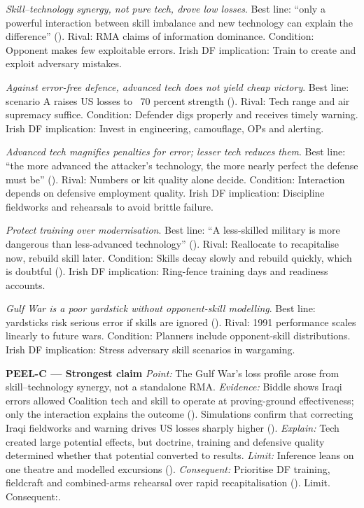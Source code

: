 \emph{Skill–technology synergy, not pure tech, drove low losses}. Best line: “only a powerful interaction between skill imbalance and new technology can explain the difference” (). Rival: RMA claims of information dominance. Condition: Opponent makes few exploitable errors. Irish DF implication: Train to create and exploit adversary mistakes.

\emph{Against error-free defence, advanced tech does not yield cheap victory}. Best line: scenario A raises US losses to ~70 percent strength (). Rival: Tech range and air supremacy suffice. Condition: Defender digs properly and receives timely warning. Irish DF implication: Invest in engineering, camouflage, OPs and alerting.

\emph{Advanced tech magnifies penalties for error; lesser tech reduces them}. Best line: “the more advanced the attacker's technology, the more nearly perfect the defense must be” (). Rival: Numbers or kit quality alone decide. Condition: Interaction depends on defensive employment quality. Irish DF implication: Discipline fieldworks and rehearsals to avoid brittle failure.

\emph{Protect training over modernisation}. Best line: “A less-skilled military is more dangerous than less-advanced technology” (). Rival: Reallocate to recapitalise now, rebuild skill later. Condition: Skills decay slowly and rebuild quickly, which is doubtful (). Irish DF implication: Ring-fence training days and readiness accounts.

\emph{Gulf War is a poor yardstick without opponent-skill modelling}. Best line: yardsticks risk serious error if skills are ignored (). Rival: 1991 performance scales linearly to future wars. Condition: Planners include opponent-skill distributions. Irish DF implication: Stress adversary skill scenarios in wargaming.

\textbf{PEEL-C — Strongest claim}
\emph{Point:} The Gulf War’s loss profile arose from skill–technology synergy, not a standalone RMA.
\emph{Evidence:} Biddle shows Iraqi errors allowed Coalition tech and skill to operate at proving-ground effectiveness; only the interaction explains the outcome (). Simulations confirm that correcting Iraqi fieldworks and warning drives US losses sharply higher ().
\emph{Explain:} Tech created large potential effects, but doctrine, training and defensive quality determined whether that potential converted to results.
\emph{Limit:} Inference leans on one theatre and modelled excursions (). \emph{Consequent:} Prioritise DF training, fieldcraft and combined-arms rehearsal over rapid recapitalisation (). Limit. Consequent:.

